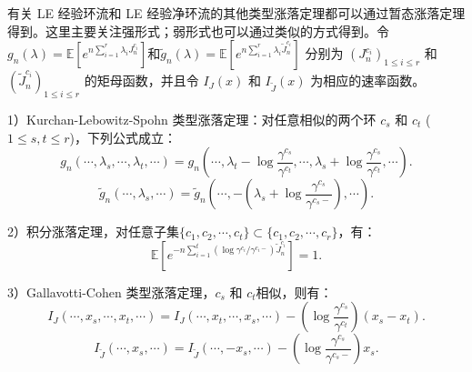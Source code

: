 有关 LE 经验环流和 LE 经验净环流的其他类型涨落定理都可以通过暂态涨落定理得到。这里主要关注强形式；弱形式也可以通过类似的方式得到。令$g_n(\lambda) = \mathbb{E}[e^{n\sum_{i=1}^r\lambda_i J^{c_i}_n}]$和$\tilde{g}_n(\lambda) = \mathbb{E}[e^{n\sum_{i=1}^{r}\lambda_i\tilde{J}^{c_i}_n}]$ 分别为 $(J^{c_i}_n)_{1\le i\le r}$ 和 $(\tilde{J}^{c_i}_n)_{1\le i\le r}$ 的矩母函数，并且令 $I_{J}(x)$ 和 $I_{\tilde{J}}(x)$ 为相应的速率函数。

1）Kurchan-Lebowitz-Spohn 类型涨落定理：对任意相似的两个环 $c_s$ 和 $c_t$ ($1\le s,t\le r$)，下列公式成立：
\begin{equation*}
	g_n(\cdots,\lambda_s,\cdots,\lambda_t,\cdots) = g_n\left(\cdots,\lambda_t-\log\frac{\gamma^{c_s}}{\gamma^{c_t}},\cdots,\lambda_s+\log\frac{\gamma^{c_s}}{\gamma^{c_t}},\cdots\right).
\end{equation*}
\begin{equation*}
	\tilde{g}_n(\cdots,\lambda_s,\cdots)=\tilde{g}_n\left(\cdots,-\left(\lambda_s+\log\frac{\gamma^{c_s}}{\gamma^{c_s-}}\right),\cdots\right).
\end{equation*}

2）积分涨落定理，对任意子集$\{c_1,c_2,\cdots, c_t\} \subset \{c_1,c_2,\cdots, c_r\}$，有： 
\begin{equation*}
	\mathbb{E}\left[e^{-n\sum_{i=1}^t(\log \gamma^{c_i}/\gamma^{c_i-})\tilde{J}^{c_i}_n}\right]=1.
\end{equation*}

3）Gallavotti-Cohen 类型涨落定理，$c_s$ 和 $c_t$相似，则有：
\begin{equation*}
	I_J(\cdots,x_s,\cdots,x_t,\cdots)=I_J(\cdots,x_t,\cdots,x_s,\cdots)-\left(\log\frac{\gamma^{c_s}}{\gamma^{c_t}}\right)(x_s-x_t).
\end{equation*}
\begin{equation*}
	I_{\tilde{J}}(\cdots,x_s,\cdots) = I_{\tilde{J}}(\cdots,-x_s,\cdots)-\left(\log\frac{\gamma^{c_s}}{\gamma^{c_s-}}\right)x_s.
\end{equation*}

